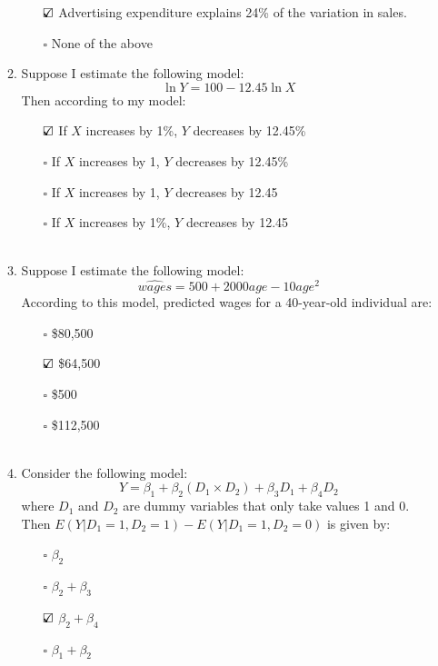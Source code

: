 \documentclass{./../../Latex/tests}
\begin{document}
\begin{enumerate}
\begin{enumerate}
\begin{enumerate}
	\item[$\text{\rlap{$\checkmark$}}\square$] Advertising expenditure explains 24\% of the variation in sales. 
	\item[$\square$] None of the above \\
\end{enumerate}
\newpage 
\item Suppose I estimate the following model:
$$ \ln Y = 100 -12.45 \ln X  $$
Then according to my model:
\begin{enumerate}
	\item[$\text{\rlap{$\checkmark$}}\square$] If $X$ increases by 1\%, $Y$ decreases by 12.45\% 
	\item[$\square$] If $X$ increases by 1, $Y$ decreases by 12.45\% 
	\item[$\square$] If $X$ increases by 1, $Y$ decreases by 12.45
	\item[$\square$] If $X$ increases by 1\%, $Y$ decreases by 12.45 \\~\\
\end{enumerate}

\item Suppose I estimate the following model:
$$ \hat{wages} = 500 + 2000 age -10 age^2 $$
According to this model, predicted wages for a 40-year-old individual are:
\begin{enumerate}
	\item[$\square$]  \$80,500
	\item[$\text{\rlap{$\checkmark$}}\square$] \$64,500
	\item[$\square$] \$500
	\item[$\square$] \$112,500 \\~\\
\end{enumerate}

\item Consider the following model:
$$ Y = \beta_1 + \beta_2 (D_1 \times D_2) + \beta_3 D_1 + \beta_4 D_2 $$
where $D_1$ and $D_2$ are dummy variables that only take values 1 and 0. Then $E(Y|D_1=1,D_2=1)-E(Y|D_1=1,D_2=0)$ is given by: \\
\begin{enumerate}
	\item[$\square$]  $\beta_2$
	\item[$\square$] $\beta_2 + \beta_3$
	\item[$\text{\rlap{$\checkmark$}}\square$] $\beta_2+\beta_4$
	\item[$\square$] $\beta_1+\beta_2$
\end{enumerate}
\end{enumerate}


\end{enumerate}
\end{document}
